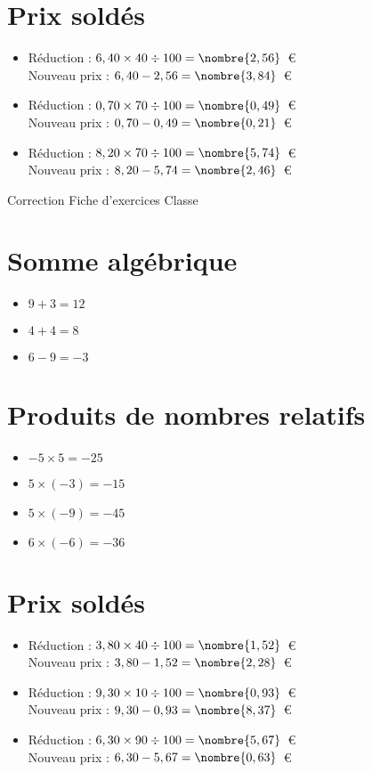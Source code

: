\documentclass[a4paper,11pt,fleqn]{article}
\begin{document}
\section{Prix soldés}
\begin{itemize}

  \item Réduction : $6,40\times40\div100=\nombre{2,56}$~€\\
  Nouveau prix : $6,40-2,56=\nombre{3,84}$~€
  \item Réduction : $0,70\times70\div100=\nombre{0,49}$~€\\
  Nouveau prix : $0,70-0,49=\nombre{0,21}$~€
  \item Réduction : $8,20\times70\div100=\nombre{5,74}$~€\\
  Nouveau prix : $8,20-5,74=\nombre{2,46}$~€
\end{itemize}
\newpage
\setcounter{exo}{0}
\setcounter{section}{0}
{Correction} \hfill {\huge Fiche d'exercices } \hfill {Classe}

\section{Somme algébrique}
\begin{itemize}

  \item $9 +3=12$
  \item $4 +4=8$
  \item $6 -9=-3$
\end{itemize}

\section{Produits de nombres relatifs}
\begin{itemize}

  \item $-5\times5=-25$
  \item $5\times(-3)=-15$
  \item $5\times(-9)=-45$
  \item $6\times(-6)=-36$
\end{itemize}

\section{Prix soldés}
\begin{itemize}

  \item Réduction : $3,80\times40\div100=\nombre{1,52}$~€\\
  Nouveau prix : $3,80-1,52=\nombre{2,28}$~€
  \item Réduction : $9,30\times10\div100=\nombre{0,93}$~€\\
  Nouveau prix : $9,30-0,93=\nombre{8,37}$~€
  \item Réduction : $6,30\times90\div100=\nombre{5,67}$~€\\
  Nouveau prix : $6,30-5,67=\nombre{0,63}$~€
\end{itemize}
\end{document}
